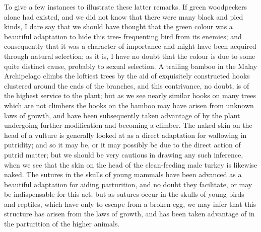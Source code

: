 \indent To give a few instances to illustrate these latter remarks. If green woodpeckers alone had existed, and we did not know that there were many black and pied kinds, I dare say that we should have thought that the green colour was a beautiful adaptation to hide this tree- frequenting bird from its enemies; and consequently that it was a character of importance and might have been acquired through natural selection; as it is, I have no doubt that the colour is due to some quite distinct cause, probably to sexual selection. A trailing bamboo in the Malay Archipelago climbs the loftiest trees by the aid of exquisitely constructed hooks clustered around the ends of the branches, and this contrivance, no doubt, is of the highest service to the plant; but as we see nearly similar hooks on many trees which are not climbers the hooks on the bamboo may have arisen from unknown laws of growth, and have been subsequently taken advantage of by the plant undergoing further modification and becoming a climber. The naked skin on the head of a vulture is generally looked at as a direct adaptation for wallowing in putridity; and so it may be, or it may possibly be due to the direct action of putrid matter; but we should be very cautious in drawing any such inference, when we see that the skin on the head of the clean-feeding male turkey is likewise naked. The sutures in the skulls of young mammals have been advanced as a beautiful adaptation for aiding parturition, and no doubt they facilitate, or may be indispensable for this act; but as sutures occur in the skulls of young birds and reptiles, which have only to escape from a broken egg, we may infer that this structure has arisen from the laws of growth, and has been taken advantage of in the parturition of the higher animals.\\
